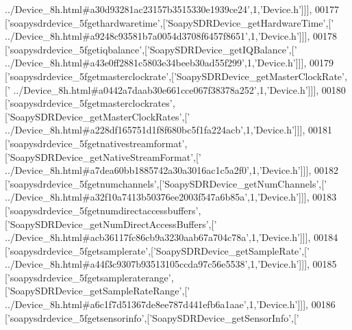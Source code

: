 \begin{DoxyCode}
{      ../Device\_8h.html#a30d93281ac23157b3515330e1939ce24'},1,\textcolor{stringliteral}{'Device.h'}]]],
00177   [\textcolor{stringliteral}{'soapysdrdevice\_5fgethardwaretime'},[\textcolor{stringliteral}{'SoapySDRDevice\_getHardwareTime'},[\textcolor{stringliteral}{'
      ../Device\_8h.html#a9248c93581b7a0054d3708f6457f8651'},1,\textcolor{stringliteral}{'Device.h'}]]],
00178   [\textcolor{stringliteral}{'soapysdrdevice\_5fgetiqbalance'},[\textcolor{stringliteral}{'SoapySDRDevice\_getIQBalance'},[\textcolor{stringliteral}{'
      ../Device\_8h.html#a43e0ff2881c5803e34beeb30ad55f299'},1,\textcolor{stringliteral}{'Device.h'}]]],
00179   [\textcolor{stringliteral}{'soapysdrdevice\_5fgetmasterclockrate'},[\textcolor{stringliteral}{'SoapySDRDevice\_getMasterClockRate'},[\textcolor{stringliteral}{'
      ../Device\_8h.html#a0442a7daab30e661cce067f38378a252'},1,\textcolor{stringliteral}{'Device.h'}]]],
00180   [\textcolor{stringliteral}{'soapysdrdevice\_5fgetmasterclockrates'},[\textcolor{stringliteral}{'SoapySDRDevice\_getMasterClockRates'},[\textcolor{stringliteral}{'
      ../Device\_8h.html#a228df165751d1f8f680bc5f1fa224acb'},1,\textcolor{stringliteral}{'Device.h'}]]],
00181   [\textcolor{stringliteral}{'soapysdrdevice\_5fgetnativestreamformat'},[\textcolor{stringliteral}{'SoapySDRDevice\_getNativeStreamFormat'},[\textcolor{stringliteral}{'
      ../Device\_8h.html#a7dea60bb1885742a30a3016ac1c5a2f0'},1,\textcolor{stringliteral}{'Device.h'}]]],
00182   [\textcolor{stringliteral}{'soapysdrdevice\_5fgetnumchannels'},[\textcolor{stringliteral}{'SoapySDRDevice\_getNumChannels'},[\textcolor{stringliteral}{'
      ../Device\_8h.html#a32f10a7413b50376ee2003f547a6b85a'},1,\textcolor{stringliteral}{'Device.h'}]]],
00183   [\textcolor{stringliteral}{'soapysdrdevice\_5fgetnumdirectaccessbuffers'},[\textcolor{stringliteral}{'SoapySDRDevice\_getNumDirectAccessBuffers'},[\textcolor{stringliteral}{'
      ../Device\_8h.html#acb36117fc86cb9a3230aab67a704c78a'},1,\textcolor{stringliteral}{'Device.h'}]]],
00184   [\textcolor{stringliteral}{'soapysdrdevice\_5fgetsamplerate'},[\textcolor{stringliteral}{'SoapySDRDevice\_getSampleRate'},[\textcolor{stringliteral}{'
      ../Device\_8h.html#a44f3c9307b93513105ccda97c56e5538'},1,\textcolor{stringliteral}{'Device.h'}]]],
00185   [\textcolor{stringliteral}{'soapysdrdevice\_5fgetsampleraterange'},[\textcolor{stringliteral}{'SoapySDRDevice\_getSampleRateRange'},[\textcolor{stringliteral}{'
      ../Device\_8h.html#a6c1f7d51367de8ee787d441efb6a1aae'},1,\textcolor{stringliteral}{'Device.h'}]]],
00186   [\textcolor{stringliteral}{'soapysdrdevice\_5fgetsensorinfo'},[\textcolor{stringliteral}{'SoapySDRDevice\_getSensorInfo'},[\textcolor{stringliteral}{'
}
\end{DoxyCode}
